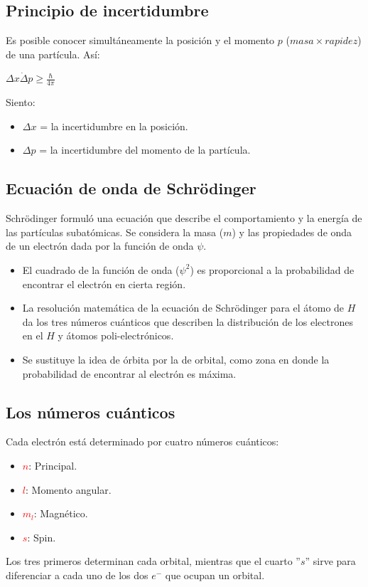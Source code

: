     \subsection{Principio de incertidumbre}
        \indent Es posible conocer simultáneamente la posición y el momento $p$ ($ masa \times rapidez$) de una partícula. Así:
        \begin{center} $\Delta x \dot \Delta p \geq \frac{\hbar}{4\pi}$ \end{center}
        \indent Siento:
        \begin{itemize}
            \item $\Delta x$ = la incertidumbre en la posición.
            \item $\Delta p$ = la incertidumbre del momento de la partícula.
        \end{itemize}

    \subsection{Ecuación de onda de Schrödinger}
       \indent Schrödinger formuló una ecuación que describe el comportamiento y la energía de las partículas subatómicas. Se considera la masa ($m$) y las propiedades de onda de un electrón dada por la función de onda $\psi$.
       \begin{itemize} 
            \item El cuadrado de la función de onda ($\psi^2$) es proporcional a la probabilidad de encontrar el electrón en cierta región.
            \item La resolución matemática de la ecuación de Schrödinger para el átomo de $H$ da los tres números cuánticos que describen la distribución de los electrones en el $H$ y átomos poli-electrónicos. 
            \item Se sustituye la idea de órbita por la de orbital, como zona en donde la probabilidad de encontrar al electrón es máxima.
       \end{itemize}

    \subsection{Los números cuánticos}
        \indent Cada electrón está determinado por cuatro números cuánticos:
            \begin{itemize}
                \item \textcolor{red}{$n$}: Principal.
                \item \textcolor{red}{$l$}: Momento angular.
                \item \textcolor{red}{$m_l$}: Magnético.
                \item \textcolor{red}{$s$}: Spin.
            \end{itemize}
        \indent Los tres primeros determinan cada orbital, mientras que el cuarto ''$s$'' sirve para diferenciar a cada uno de los dos $e^-$ que ocupan un orbital.

